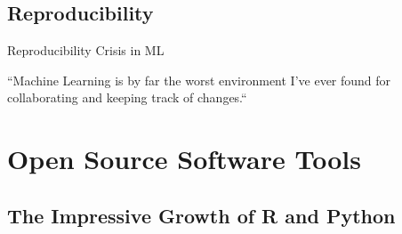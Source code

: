 \documentclass[compress]{beamer}
\begin{document}
\subsection{Reproducibility}
{


    \begin{frame}{Reproducibility Crisis in ML}
	\LARGE

	``Machine Learning is by far the worst environment I’ve ever found for collaborating and keeping track of changes.``

   \end{frame}

}



%
%
%
%
%
%





\section{Open Source Software Tools}

\subsection{The Impressive Growth of R and Python}





\end{document}
